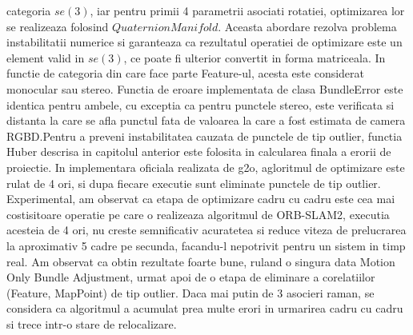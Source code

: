 \documentclass[12pt,a4paper]{report}
\begin{document}
categoria $ se(3) $, iar pentru primii 4 parametrii asociati rotatiei, optimizarea lor se realizeaza
folosind $ QuaternionManifold $. Aceasta abordare rezolva problema instabilitatii numerice si 
garanteaza ca rezultatul operatiei de optimizare este un element valid in $ se(3) $, ce poate fi 
ulterior convertit in forma matriceala. In functie de categoria din care face parte Feature-ul, 
acesta este considerat monocular sau stereo. Functia de eroare implementata de clasa BundleError 
este identica pentru ambele, cu exceptia ca pentru punctele stereo, este verificata si distanta 
la care se afla punctul fata de valoarea la care a fost estimata de camera RGBD.\@ Pentru a preveni
instabilitatea cauzata de punctele de tip outlier, functia Huber descrisa in capitolul anterior este
folosita in calcularea finala a erorii de proiectie. In implementara oficiala realizata de g2o, 
agloritmul de optimizare este rulat de 4 ori, si dupa fiecare executie sunt eliminate punctele de tip 
outlier. Experimental, am observat ca etapa de optimizare cadru cu cadru este cea mai costisitoare 
operatie pe care o realizeaza algoritmul de ORB-SLAM2, executia acesteia de 4 ori, nu creste 
semnificativ acuratetea si reduce viteza de prelucrarea la aproximativ 5 cadre pe secunda, facandu-l 
nepotrivit pentru un sistem in timp real. Am observat ca obtin rezultate foarte bune, ruland o singura
data Motion Only Bundle Adjustment, urmat apoi de o etapa de eliminare a corelatiilor 
(Feature, MapPoint) de tip outlier. Daca mai putin de 3 asocieri raman, se considera ca algoritmul
a acumulat prea multe erori in urmarirea cadru cu cadru si trece intr-o stare de relocalizare. \\
\end{document}

